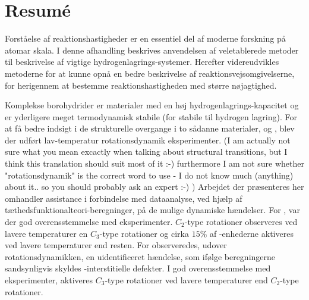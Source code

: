  

\chapter*{Resum\'e}


Forståelse af reaktionshastigheder er en essentiel del af moderne forskning på atomar skala.
I denne afhandling beskrives anvendelsen af veletablerede metoder til beskrivelse af vigtige hydrogenlagrings-systemer. Herefter videreudvikles metoderne for at kunne opnå en bedre beskrivelse af reaktionsvejsomgivelserne, for herigennem at bestemme reaktionshastigheden med større nøjagtighed.

Komplekse borohydrider er materialer med en høj hydrogenlagrings-kapacitet og er yderligere meget termodynamisk stabile (for stabile til hydrogen lagring).
For at få bedre indsigt i de strukturelle overgange i to sådanne materialer,  og , blev der udført lav-temperatur rotationsdynamik eksperimenter.
(I am actually not sure what you mean excactly when talking about structural transitions, but I think this translation should suit most of it :-) furthermore I am not sure whether "rotationsdynamik" is the correct word to use - I do not know much (anything) about it.. so you should probably ask an expert :-) )
Arbejdet der præsenteres her omhandler assistance i forbindelse med dataanalyse, ved hjælp af tæthedsfunktionalteori-beregninger, på de mulige dynamiske hændelser.
For , var der god overensstemmelse med eksperimenter. $C_2$-type rotationer observeres ved lavere temperaturer en $C_3$-type rotationer og cirka $15\%$ af -enhederne aktiveres ved lavere temperaturer end resten.
For  observeredes, udover rotationsdynamikken, en uidentificeret hændelse, som ifølge beregningerne sandsynligvis skyldes -interstitielle defekter.
I god overensstemmelse med eksperimenter, aktiveres $C_3$-type rotationer ved lavere temperaturer end $C_2$-type rotationer.

